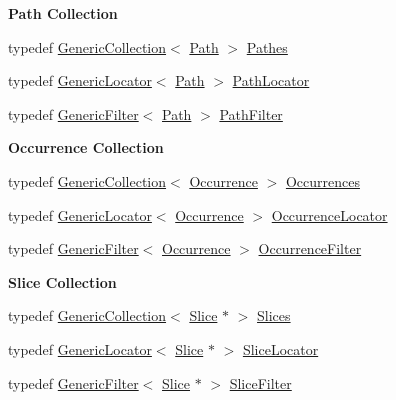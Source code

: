 \begin{Indent}\textbf{ Path Collection}\par
\begin{DoxyCompactItemize}
\item 
typedef \hyperlink{classHurricane_1_1GenericCollection}{Generic\+Collection}$<$ \hyperlink{classHurricane_1_1Path}{Path} $>$ \hyperlink{namespaceHurricane_a77e8a0f11b7d0d65a47a592f7bdfd061}{Pathes}
\item 
typedef \hyperlink{classHurricane_1_1GenericLocator}{Generic\+Locator}$<$ \hyperlink{classHurricane_1_1Path}{Path} $>$ \hyperlink{namespaceHurricane_a4077fe144cc9efa686ec63667b7dd9bf}{Path\+Locator}
\item 
typedef \hyperlink{classHurricane_1_1GenericFilter}{Generic\+Filter}$<$ \hyperlink{classHurricane_1_1Path}{Path} $>$ \hyperlink{namespaceHurricane_af42ed7a6acaba43b9d5f30b789105bc1}{Path\+Filter}
\end{DoxyCompactItemize}
\end{Indent}
\begin{Indent}\textbf{ Occurrence Collection}\par
\begin{DoxyCompactItemize}
\item 
typedef \hyperlink{classHurricane_1_1GenericCollection}{Generic\+Collection}$<$ \hyperlink{classHurricane_1_1Occurrence}{Occurrence} $>$ \hyperlink{namespaceHurricane_a1912927c128eee859af62dbe4cbe0a6b}{Occurrences}
\item 
typedef \hyperlink{classHurricane_1_1GenericLocator}{Generic\+Locator}$<$ \hyperlink{classHurricane_1_1Occurrence}{Occurrence} $>$ \hyperlink{namespaceHurricane_aa3f9cf43b9c8f3050da0a2549bb3d64d}{Occurrence\+Locator}
\item 
typedef \hyperlink{classHurricane_1_1GenericFilter}{Generic\+Filter}$<$ \hyperlink{classHurricane_1_1Occurrence}{Occurrence} $>$ \hyperlink{namespaceHurricane_a4d74662402bde091565f52b77e261560}{Occurrence\+Filter}
\end{DoxyCompactItemize}
\end{Indent}
\begin{Indent}\textbf{ Slice Collection}\par
\begin{DoxyCompactItemize}
\item 
typedef \hyperlink{classHurricane_1_1GenericCollection}{Generic\+Collection}$<$ \hyperlink{classHurricane_1_1Slice}{Slice} $\ast$ $>$ \hyperlink{namespaceHurricane_aa4a7e8a563c5687621eb5e57ade1706a}{Slices}
\item 
typedef \hyperlink{classHurricane_1_1GenericLocator}{Generic\+Locator}$<$ \hyperlink{classHurricane_1_1Slice}{Slice} $\ast$ $>$ \hyperlink{namespaceHurricane_a5c3b720aae3437342e9d6c57729dc895}{Slice\+Locator}
\item 
typedef \hyperlink{classHurricane_1_1GenericFilter}{Generic\+Filter}$<$ \hyperlink{classHurricane_1_1Slice}{Slice} $\ast$ $>$ \hyperlink{namespaceHurricane_a80703f9d02b235f3291fabbf53f86d4e}{Slice\+Filter}
\end{DoxyCompactItemize}
\end{Indent}
